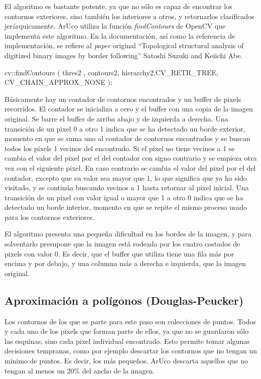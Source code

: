El algoritmo es bastante potente, ya que no sólo es capaz de encontrar los contornos exteriores, sino también los interiores a otros, y retornarlos clasificados jerárquicamente. ArUco utiliza la función \textit{findContours} de OpenCV que implementa este algoritmo. En la documentación, así como la referencia de implementación, se refiere al \textit{paper} original ``Topological structural analysis of digitized binary images by border following''  Satoshi Suzuki and Keiichi Abe.

\begin{listing}[style=C++]
cv::findContours ( thres2 , contours2, hierarchy2,CV_RETR_TREE, CV_CHAIN_APPROX_NONE );
\end{listing} 

\begin{listing}[style=C++]
CV_IMPL int
cvFindContours( void*  img,  CvMemStorage*  storage,
                CvSeq**  firstContour, int  cntHeaderSize,
                int  mode,
                int  method, CvPoint offset )
{
\end{listing} 
Básicamente hay un contador de contornos encontrados y un buffer de pixels recorridos. El contador se inicializa a cero y el buffer con una copia de la imagen original. Se barre el buffer de arriba abajo y de izquierda a derecha. Una transición de un pixel 0 a otro 1 indica que se ha detectado un borde exterior, momento en que se suma uno al contador de contornos encontrados y se buscan todos los pixels 1 vecinos del encontrado. Si el pixel no tiene vecinos a 1 se cambia el valor del pixel por el del contador con signo contrario y se empieza otra vez con el siguiente pixel. En caso contrario se cambia el valor del pixel por el del contador, excepto que su valor sea mayor que 1, lo que significa que ya ha sido visitado, y se continúa buscando vecinos a 1 hasta retornar al pixel inicial. Una transición de un pixel con valor igual o mayor que 1 a otro 0 indica que se ha detectado un borde interior, momento en que se repite el mismo proceso usado para los contornos exteriores.

El algoritmo presenta una pequeña dificultad en los bordes de la imagen, y para solventarlo presupone que la imagen está rodeada por los cuatro costados de pixels con valor 0. Es decir, que el buffer que utiliza tiene una fila más por encima y por debajo, y una columna más a derecha e izquierda, que la imagen original.

\subsection{Aproximación a polígonos (Douglas-Peucker)}
Los contornos de los que se parte para este paso son colecciones de puntos. Todos y cada uno de los pixels que forman parte de ellos, ya que no se guardaron sólo las esquinas, sino cada pixel individual encontrado. Esto permite tomar algunas decisiones tempranas, como por ejemplo descartar los contornos que no tengan un mínimo de puntos. Es decir, los más pequeños. ArUco descarta aquellos que no tengan al menos un 20\% del ancho de la imagen. 

